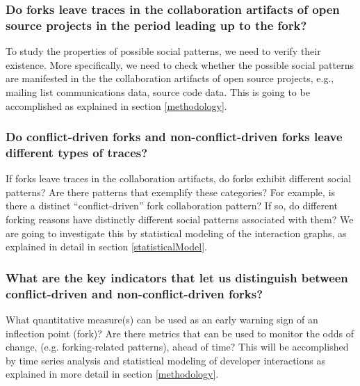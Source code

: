 \documentclass[12pt,letterpaper]{gthesis2}  %
\begin{document}
\subsubsection*{\hspace{4 mm} Do forks leave traces in the collaboration artifacts of open source projects in the period leading up to the fork?\\}

To study the properties of possible social patterns, we need to verify their existence. More specifically, we need to check whether the possible social patterns are manifested in the the collaboration artifacts of open source projects, e.g., mailing list communications data, source code data. This is going to be accomplished as explained in section \ref{methodology}.

\subsubsection*{\hspace{4 mm} Do conflict-driven forks and non-conflict-driven forks leave different types of traces?\\}

If forks leave traces in the collaboration artifacts, do forks exhibit different social patterns? Are there patterns that exemplify these categories? For example, is there a distinct ``conflict-driven'' fork collaboration pattern? If so, do different forking reasons have distinctly different social patterns associated with them? We are going to investigate this by statistical modeling of the interaction graphs, as explained in detail in section \ref{statisticalModel}.

\subsubsection*{\hspace{4 mm} What are the key indicators that let us distinguish between conflict-driven and non-conflict-driven forks?\\}

What quantitative measure(s) can be used as an early warning sign of an inflection point (fork)? Are there metrics that can be used to monitor the odds of change, (e.g. forking-related patterns), ahead of time? This will be accomplished by time series analysis and statistical modeling of developer interactions as explained in more detail in section \ref{methodology}.\\
\end{document}
